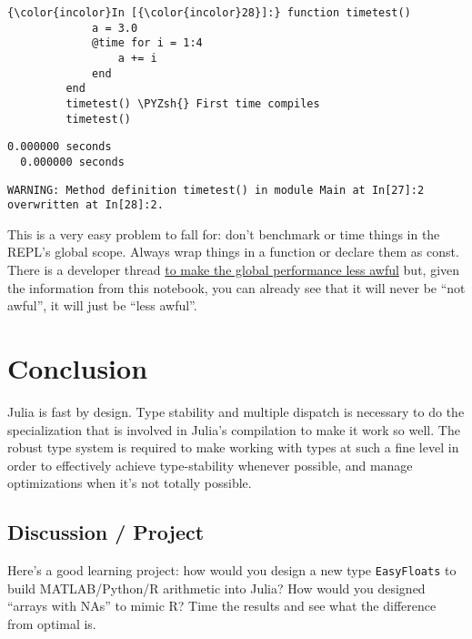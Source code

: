 \documentclass[11pt]{article}
\def\PYZsh{\char`\#}
\begin{document}
    \begin{Verbatim}[commandchars=\\\{\}]
{\color{incolor}In [{\color{incolor}28}]:} function timetest()
             a = 3.0
             @time for i = 1:4
                 a += i
             end
         end
         timetest() \PYZsh{} First time compiles
         timetest()
\end{Verbatim}

    \begin{Verbatim}[commandchars=\\\{\}]
  0.000000 seconds
  0.000000 seconds

    \end{Verbatim}

    \begin{Verbatim}[commandchars=\\\{\}]
WARNING: Method definition timetest() in module Main at In[27]:2 overwritten at In[28]:2.

    \end{Verbatim}

    This is a very easy problem to fall for: don't benchmark or time things
in the REPL's global scope. Always wrap things in a function or declare
them as const. There is a developer thread
\href{https://github.com/JuliaLang/julia/issues/8870}{to make the global
performance less awful} but, given the information from this notebook,
you can already see that it will never be ``not awful'', it will just be
``less awful''.

    \section{Conclusion}\label{conclusion}

Julia is fast by design. Type stability and multiple dispatch is
necessary to do the specialization that is involved in Julia's
compilation to make it work so well. The robust type system is required
to make working with types at such a fine level in order to effectively
achieve type-stability whenever possible, and manage optimizations when
it's not totally possible.

\subsection{Discussion / Project}\label{discussion-project}

Here's a good learning project: how would you design a new type
\texttt{EasyFloats} to build MATLAB/Python/R arithmetic into Julia? How
would you designed ``arrays with NAs'' to mimic R? Time the results and
see what the difference from optimal is.


    
    
    
    
\end{document}
